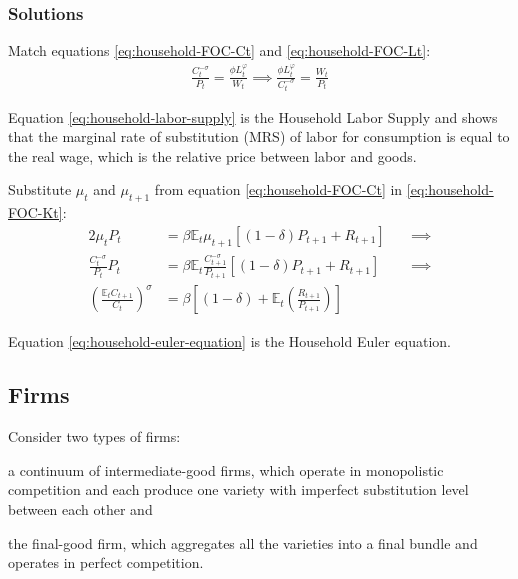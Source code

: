 \documentclass[
	12pt, 
	]{article}
\numberwithin{equation}{section}
\theoremstyle{definition}
\theoremstyle{plain}
\theoremstyle{plain}
\theoremstyle{plain}
\begin{document}
\subsubsection*{Solutions}

Match equations \ref{eq:household-FOC-Ct} and \ref{eq:household-FOC-Lt}:
\begin{align}
\label{eq:household-labor-supply}
	\frac{C_t^{-\sigma}}{P_t} = \frac{\phi L_t^{\varphi}}{W_t} \implies 
	\frac{\phi L_t^{\varphi}}{C_t^{-\sigma}} = \frac{W_t}{P_t}
\end{align}

Equation \ref{eq:household-labor-supply} is the Household Labor Supply and shows that the marginal rate of substitution (MRS) of labor for consumption is equal to the real wage, which is the relative price between labor and goods.

Substitute $\mu_t$ and $\mu_{t+1}$ from equation \ref{eq:household-FOC-Ct} in \ref{eq:household-FOC-Kt}:
\begin{alignat}{2}
	\mu_t P_t & = \beta \mathbb{E}_t \mu_{t+1} [(1-\delta) P_{t+1} + R_{t+1}] \quad &\implies \nonumber \\
	\frac{C_t^{-\sigma}}{P_t} P_t & = \beta \mathbb{E}_t \frac{C_{t+1}^{-\sigma}}{P_{t+1}} [(1-\delta) P_{t+1} + R_{t+1}] &\implies \nonumber \\
	\left( \frac{\mathbb{E}_t C_{t+1}}{C_t} \right)^\sigma & = \beta \left[ (1-\delta) + \mathbb{E}_t \left(\frac{R_{t+1}}{P_{t+1}}\right) \right] \label{eq:household-euler-equation}
\end{alignat}

Equation \ref{eq:household-euler-equation} is the Household Euler equation.


\subsection*{Firms}

Consider two types of firms: 
\begin{enumerate*}[label=(\arabic*)]
	\item a continuum of intermediate-good firms, which operate in monopolistic competition and each produce one variety with imperfect substitution level between each other and
	
	\item the final-good firm, which aggregates all the varieties into a final bundle and operates in perfect competition.
\end{enumerate*}
\end{document}
